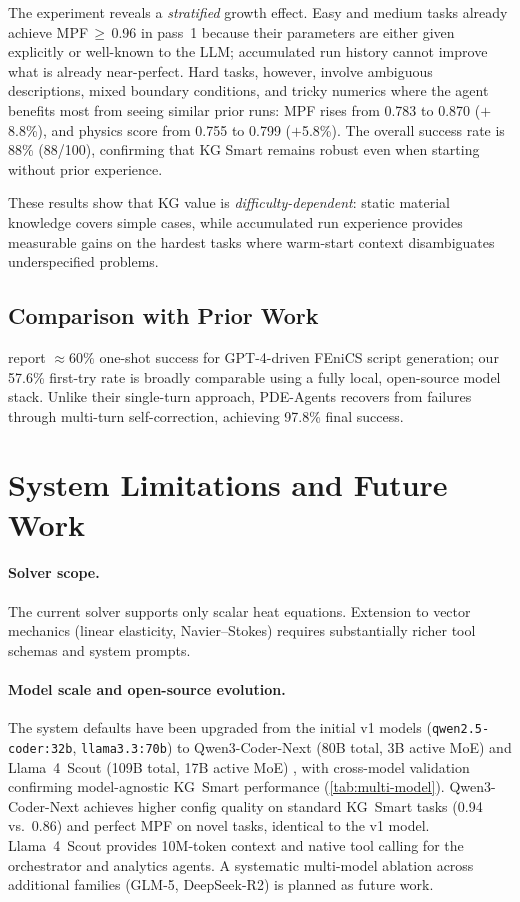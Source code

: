 \documentclass[twocolumn]{article}
\begin{document}
The experiment reveals a \emph{stratified} growth effect.  Easy and
medium tasks already achieve MPF\,$\geq$\,0.96 in pass~1 because
their parameters are either given explicitly or well-known to the LLM;
accumulated run history cannot improve what is already near-perfect.
Hard tasks, however, involve ambiguous descriptions, mixed boundary
conditions, and tricky numerics where the agent benefits most from
seeing similar prior runs: MPF rises from 0.783 to 0.870 ($+$8.8\%),
and physics score from 0.755 to 0.799 ($+$5.8\%).  The overall
success rate is 88\% (88/100), confirming that KG Smart remains robust
even when starting without prior experience.

These results show that KG value is \emph{difficulty-dependent}: static
material knowledge covers simple cases, while accumulated run
experience provides measurable gains on the hardest tasks where
warm-start context disambiguates underspecified problems.

\subsection{Comparison with Prior Work}

\citet{bauer2023llm} report $\approx 60\%$ one-shot success for
GPT-4-driven FEniCS script generation; our 57.6\% first-try rate is
broadly comparable using a fully local, open-source model stack.
Unlike their single-turn approach, PDE-Agents recovers from failures
through multi-turn self-correction, achieving 97.8\% final success.

\section{System Limitations and Future Work}
\label{sec:limitations}

\paragraph{Solver scope.}
The current solver supports only scalar heat equations.  Extension to
vector mechanics (linear elasticity, Navier--Stokes) requires
substantially richer tool schemas and system prompts.

\paragraph{Model scale and open-source evolution.}
The system defaults have been upgraded from the initial v1 models
(\texttt{qwen2.5-coder:32b}, \texttt{llama3.3:70b}) to
Qwen3-Coder-Next (80B total, 3B active MoE) \citep{qwen3coder2026}
and Llama~4~Scout (109B total, 17B active MoE) \citep{llama4}, with
cross-model validation confirming model-agnostic KG~Smart performance
(\cref{tab:multi-model}).  Qwen3-Coder-Next achieves higher config
quality on standard KG~Smart tasks (0.94 vs.\ 0.86) and perfect MPF on
novel tasks, identical to the v1 model.  Llama~4~Scout provides 10M-token
context and native tool calling for the orchestrator and analytics agents.
A systematic multi-model ablation across additional families (GLM-5,
DeepSeek-R2) is planned as future work.
\end{document}
